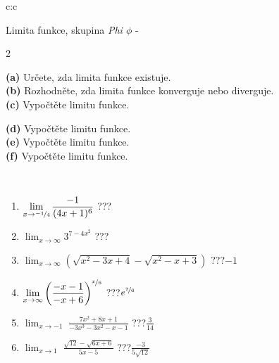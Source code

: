 \documentclass[10pt]{report}
\begin{document}
\begin{tabular}{c:c}
\begin{minipage}[c][104.5mm][t]{0.5\linewidth}
\begin{center}
\vspace{7mm}
{\huge Limita funkce, skupina \textit{Phi $\phi$} -}\\[5mm]
\begin{minipage}{0.95\linewidth}
\begin{center}
{\small \begin{multicols}{2} \raggedright
\textbf{(a)} Určete, zda limita funkce existuje. \\[1mm]
\textbf{(b)} Rozhodněte, zda limita funkce konverguje nebo diverguje. \\[1mm]
\textbf{(c)} Vypočtěte limitu funkce. \par \columnbreak
\textbf{(d)} Vypočtěte limitu funkce. \\[1mm]
\textbf{(e)} Vypočtěte limitu funkce. \\[1mm]
\textbf{(f)} Vypočtěte limitu funkce. \\[1mm]
\end{multicols}
}
\end{center}
\end{minipage}
\\[4mm]
\begin{minipage}{0.79\linewidth}
\begin{center}
\begin{varwidth}{\linewidth}
\begin{enumerate}
\normalsize
\item $\displaystyle\lim_{x\to\nicefrac{-1}{4}}{\frac{-1}{(4x+1)^{6}}}$\quad \dotfill\; ???\;\dotfill \quad {}
\item $\displaystyle\lim_{x\to\infty}{3^{7-4x^2}}$\quad \dotfill\; ???\;\dotfill \quad {}
\item $\displaystyle\lim_{x\to\infty}{\left(\sqrt{x^2-3x+4} - \sqrt{x^2-x+3}\right)}$\quad \dotfill\; ???\;\dotfill \quad $-1$
\item $\displaystyle\lim_{x\to\infty}{\left( \frac{-x-1}{-x+6} \right)^{\nicefrac{x}{6}}}$\quad \dotfill\; ???\;\dotfill \quad $e^{\nicefrac{7}{6}}$
\item $\displaystyle\lim_{x\to -1}{\;\frac{7x^2+8x+1}{-3x^3-3x^2-x-1}}$\quad \dotfill\; ???\;\dotfill \quad $\frac{3}{14}$
\item $\displaystyle\lim_{x\to 1}{\;\frac{\sqrt{12}-\sqrt{6x+6}}{5x-5}}$\quad \dotfill\; ???\;\dotfill \quad $\frac{-3}{5\sqrt{12}}$

\end{enumerate}
\end{varwidth}
\end{center}
\end{minipage}
\end{center}
\end{minipage}
\end{tabular}
\end{document}
